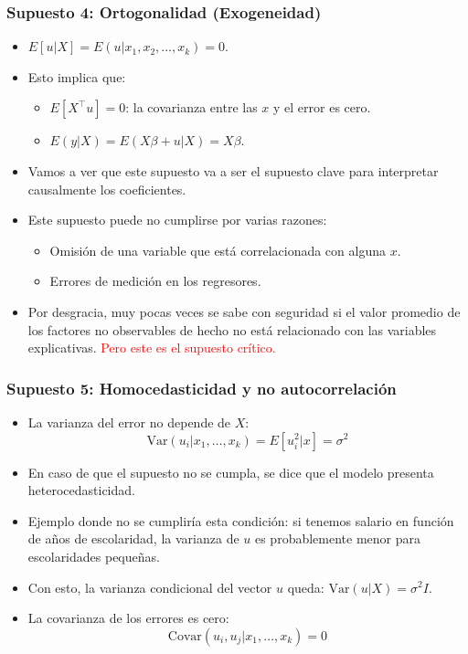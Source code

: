 \documentclass{beamer}
\begin{document}
\begin{frame}
\frametitle{Supuesto 4: Ortogonalidad (Exogeneidad)}
\begin{itemize}
    \item $E[u|X] = E(u|x_1, x_2, \ldots , x_k) = 0$.
    \item Esto implica que:
    \begin{itemize}
        \item $E[X^{\top}u] = 0$: la covarianza entre las $x$ y el error es cero.
        \item $E(y|X) = E(X\beta + u|X) = X\beta$.
    \end{itemize}
    \item Vamos a ver que este supuesto va a ser el supuesto clave para interpretar causalmente los coeficientes.
    \item Este supuesto puede no cumplirse por varias razones:
    \begin{itemize}
        \item Omisión de una variable que está correlacionada con alguna $x$.
        \item Errores de medición en los regresores.
    \end{itemize}
    \item Por desgracia, muy pocas veces se sabe con seguridad si el valor promedio de los factores no observables de hecho no está relacionado con las variables explicativas. \textcolor{red}{Pero este es el supuesto crítico.}
\end{itemize}
\end{frame}
\begin{frame}
\frametitle{Supuesto 5: Homocedasticidad y no autocorrelación}
\begin{itemize}
    \item La varianza del error no depende de $X$:
    \[
    \text{Var}(u_i|x_1, \ldots , x_k) = E[u_i^2|x] = \sigma^2
    \]
    \item En caso de que el supuesto no se cumpla, se dice que el modelo presenta heterocedasticidad.
    \item Ejemplo donde no se cumpliría esta condición: si tenemos salario en función de años de escolaridad, la varianza de $u$ es probablemente menor para escolaridades pequeñas.

    \item Con esto, la varianza condicional del vector $u$ queda: $\text{Var}(u|X) = \sigma^2I$.
     \item La covarianza de los errores es cero:
    \[
    \text{Covar}(u_i,u_j|x_1, \ldots , x_k) = 0
    \]
\end{itemize}
\end{frame}
\end{document}
